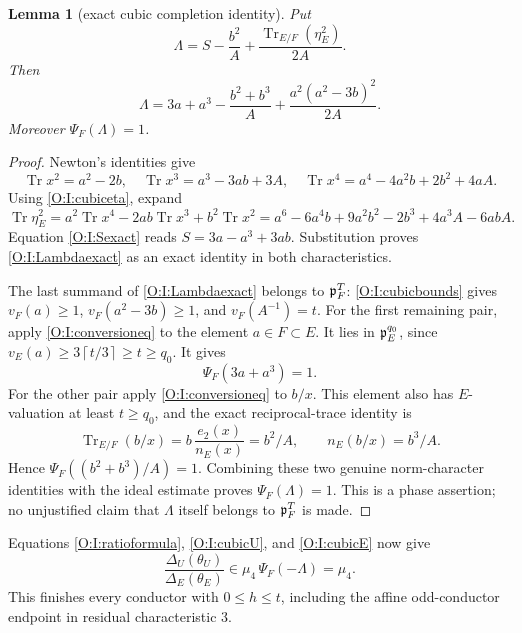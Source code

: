 \documentclass[11pt]{amsart}
\newtheorem{lemma}[theorem]{Lemma}
\theoremstyle{definition}
\theoremstyle{remark}
\newcommand{\Tr}{\operatorname{Tr}}
\newcommand{\ceil}[1]{\left\lceil #1\right\rceil}
\begin{document}
\begin{lemma}[exact cubic completion identity]\label{O:I:cubicidentity}
Put
\[
 \Lambda=S-\frac{b^2}{A}+\frac{\Tr_{E/F}(\eta_E^2)}{2A}.
\]
Then
\begin{equation}\label{O:I:Lambdaexact}
 \Lambda=3a+a^3-\frac{b^2+b^3}{A}
          +\frac{a^2(a^2-3b)^2}{2A}.
\end{equation}
Moreover $\Psi_F(\Lambda)=1$.
\end{lemma}
\begin{proof}
Newton's identities give
\[
 \Tr x^2=a^2-2b,\quad
 \Tr x^3=a^3-3ab+3A,\quad
 \Tr x^4=a^4-4a^2b+2b^2+4aA.
\]
Using \eqref{O:I:cubiceta}, expand
\[
 \Tr\eta_E^2=a^2\Tr x^4-2ab\Tr x^3+b^2\Tr x^2
 =a^6-6a^4b+9a^2b^2-2b^3+4a^3A-6abA.
\]
Equation \eqref{O:I:Sexact} reads $S=3a-a^3+3ab$.
Substitution proves \eqref{O:I:Lambdaexact} as an exact identity in both
characteristics.

The last summand of \eqref{O:I:Lambdaexact} belongs to $\mathfrak p_F^T$:
\eqref{O:I:cubicbounds} gives $v_F(a)\ge1$, $v_F(a^2-3b)\ge1$, and
$v_F(A^{-1})=t$.
For the first remaining pair, apply \eqref{O:I:conversioneq} to the element
$a\in F\subset E$. It lies in $\mathfrak p_E^{q_0}$, since
$v_E(a)\ge3\ceil{t/3}\ge t\ge q_0$. It gives
\[
 \Psi_F(3a+a^3)=1.
\]
For the other pair apply \eqref{O:I:conversioneq} to $b/x$.
This element also has $E$-valuation at least $t\ge q_0$, and the exact
reciprocal-trace identity is
\[
 \Tr_{E/F}(b/x)=b\,\frac{e_2(x)}{n_E(x)}=b^2/A,
 \qquad n_E(b/x)=b^3/A.
\]
Hence $\Psi_F((b^2+b^3)/A)=1$. Combining these two genuine norm-character
identities with the ideal estimate proves $\Psi_F(\Lambda)=1$.
This is a phase assertion; no unjustified claim that $\Lambda$ itself
belongs to $\mathfrak p_F^T$ is made.
\end{proof}

Equations \eqref{O:I:ratioformula}, \eqref{O:I:cubicU}, and \eqref{O:I:cubicE} now give
\[
 \frac{\Delta_U(\theta_U)}{\Delta_E(\theta_E)}
 \in\mu_4\,\Psi_F(-\Lambda)=\mu_4.
\]
This finishes every conductor with $0\le h\le t$, including the affine
odd-conductor endpoint in residual characteristic $3$.
\end{document}
